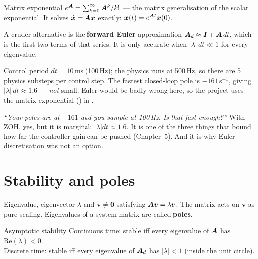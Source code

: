 \begin{definition}{Matrix exponential}
$e^{\bm{A}} = \sum_{k=0}^{\infty} \bm{A}^k / k!$ --- the matrix generalisation of the scalar exponential. It
solves $\dot{\bm{x}} = \bm{A}\bm{x}$ exactly: $\bm{x}(t) = e^{\bm{A} t}\bm{x}(0)$.
\end{definition}

A cruder alternative is the \textbf{forward Euler} approximation $\bm{A}_d \approx \bm{I} + \bm{A}\,dt$, which is
the first two terms of that series. It is only accurate when $|\lambda|\,dt \ll 1$ for every eigenvalue.

\begin{inproject}
Control period $dt = 10$\,ms (100\,Hz); the physics runs at 500\,Hz, so there are 5 physics substeps per
control step. The fastest closed-loop pole is $-161$\,s$^{-1}$, giving $|\lambda|\,dt \approx 1.6$ ---
\emph{not} small. Euler would be badly wrong here, so the project uses the matrix exponential
() in .
\end{inproject}

\begin{vivabox}
\emph{``Your poles are at $-161$ and you sample at 100\,Hz. Is that fast enough?''} With ZOH, yes, but it
is marginal: $|\lambda| dt \approx 1.6$. It is one of the three things that bound how far the controller
gain can be pushed (Chapter~5). And it is why Euler discretisation was not an option.
\end{vivabox}

\section{Stability and poles}

\begin{definition}{Eigenvalue, eigenvector}
$\lambda$ and $\bm{v} \neq \bm{0}$ satisfying $\bm{A}\bm{v} = \lambda\bm{v}$. The matrix acts on $\bm{v}$ as
pure scaling. Eigenvalues of a system matrix are called \textbf{poles}.
\end{definition}

\begin{definition}{Asymptotic stability}
Continuous time: stable iff every eigenvalue of $\bm{A}$ has $\mathrm{Re}(\lambda) < 0$.\\
Discrete time: stable iff every eigenvalue of $\bm{A}_d$ has $|\lambda| < 1$ (inside the unit circle).
\end{definition}

